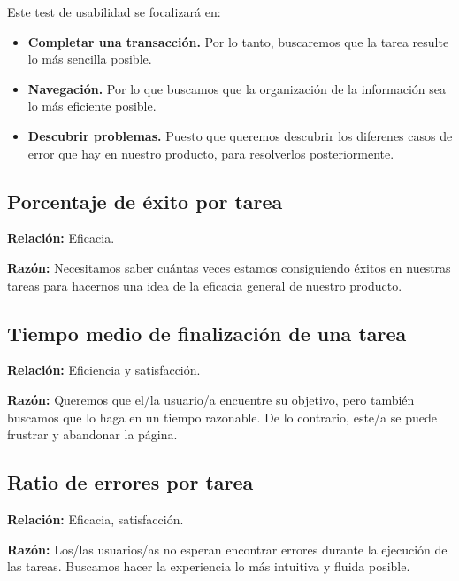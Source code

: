 \documentclass[spanish]{article}
\begin{document}
Este test de usabilidad se focalizará en:

\begin{itemize}

\item \textbf{Completar una transacción.} Por lo tanto, buscaremos
que la tarea resulte lo más sencilla posible.

\item \textbf{Navegación.} Por lo que buscamos que la organización de
la información sea lo más eficiente posible.

\item \textbf{Descubrir problemas.} Puesto que queremos descubrir los
diferenes casos de error que hay en nuestro producto, para
resolverlos posteriormente.

\end{itemize}

\subsection{Porcentaje de éxito por tarea}

\textbf{Relación:} Eficacia.\newline

\textbf{Razón:} Necesitamos saber cuántas veces estamos consiguiendo
éxitos en nuestras tareas para hacernos una idea de la
eficacia general de nuestro producto.

\subsection{Tiempo medio de finalización de una tarea}

\textbf{Relación:} Eficiencia y satisfacción.\newline

\textbf{Razón:} Queremos que el/la usuario/a encuentre su objetivo,
pero también buscamos que lo haga en un tiempo razonable. De
lo contrario, este/a se puede frustrar y abandonar la
página.

\subsection{Ratio de errores por tarea}

\textbf{Relación:} Eficacia, satisfacción.\newline

\textbf{Razón:} Los/las usuarios/as no esperan encontrar
errores durante la ejecución de las tareas. Buscamos hacer
la experiencia lo más intuitiva y fluida posible.
\end{document}
